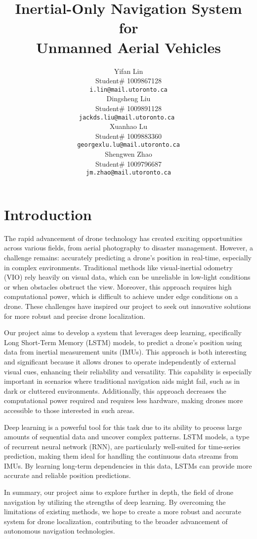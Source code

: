 \documentclass{article} %
\title{Inertial-Only Navigation System for \\Unmanned Aerial Vehicles}
\author{Yifan Lin  \\
Student\# 1009867128\\
\texttt{i.lin@mail.utoronto.ca} \\
\And
Dingsheng Liu  \\
Student\# 1009891128 \\
\texttt{jackds.liu@mail.utoronto.ca\,} \\
\AND
Xuanhao Lu  \\
Student\# 1009883360 \\
\texttt{georgexlu.lu@mail.utoronto.ca} \\
\And
Shengwen Zhao \\
Student\# 1009796687 \\
\texttt{jm.zhao@mail.utoronto.ca\qquad} \\
\AND
}
\begin{document}
\maketitle



\section{Introduction}

The rapid advancement of drone technology has created exciting opportunities across various fields, from aerial photography to disaster management. However, a challenge remains: accurately predicting a drone's position in real-time, especially in complex environments. Traditional methods like visual-inertial odometry (VIO) rely heavily on visual data, which can be unreliable in low-light conditions or when obstacles obstruct the view. Moreover, this approach requires high computational power, which is difficult to achieve under edge conditions on a drone. These challenges have inspired our project to seek out innovative solutions for more robust and precise drone localization.

Our project aims to develop a system that leverages deep learning, specifically Long Short-Term Memory (LSTM) models, to predict a drone's position using data from inertial measurement units (IMUs). This approach is both interesting and significant because it allows drones to operate independently of external visual cues, enhancing their reliability and versatility. This capability is especially important in scenarios where traditional navigation aids might fail, such as in dark or cluttered environments. Additionally, this approach decreases the computational power required and requires less hardware, making drones more accessible to those interested in such areas.

Deep learning is a powerful tool for this task due to its ability to process large amounts of sequential data and uncover complex patterns. LSTM models, a type of recurrent neural network (RNN), are particularly well-suited for time-series prediction, making them ideal for handling the continuous data streams from IMUs. By learning long-term dependencies in this data, LSTMs can provide more accurate and reliable position predictions.

In summary, our project aims to explore further in depth, the field of drone navigation by utilizing the strengths of deep learning. By overcoming the limitations of existing methods, we hope to create a more robust and accurate system for drone localization, contributing to the broader advancement of autonomous navigation technologies.
\end{document}
